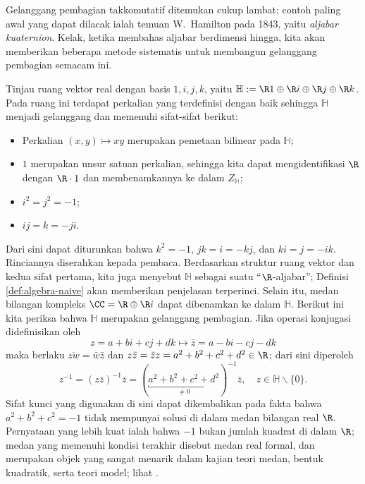 Gelanggang pembagian takkomutatif ditemukan cukup lambat; contoh paling awal yang dapat dilacak ialah temuan W.\ Hamilton pada 1843, yaitu \emph{aljabar kuaternion}. Kelak, ketika membahas aljabar berdimensi hingga, kita akan memberikan beberapa metode sistematis untuk membangun gelanggang pembagian semacam ini.
\begin{example}[Kuaternion]\label{eg:Hamilton-quaternion}
	Tinjau ruang vektor real dengan basis $1, i, j, k$, yaitu $\mathbb{H} := \R 1 \oplus \R i \oplus \R j \oplus \R k$. Pada ruang ini terdapat perkalian yang terdefinisi dengan baik sehingga $\mathbb{H}$ menjadi gelanggang dan memenuhi sifat-sifat berikut:
	\begin{itemize}
		\item Perkalian $(x,y) \mapsto xy$ merupakan pemetaan bilinear pada $\mathbb{H}$;
		\item $1$ merupakan unsur satuan perkalian, sehingga kita dapat mengidentifikasi $\R$ dengan $\R \cdot 1$ dan membenamkannya ke dalam $Z_{\mathbb{H}}$;
		\item $i^2 = j^2 = -1$;
		\item $ij=k=-ji$.
	\end{itemize}
	Dari sini dapat diturunkan bahwa $k^2 = -1$, $jk=i=-kj$, dan $ki=j=-ik$. Rinciannya diserahkan kepada pembaca. Berdasarkan struktur ruang vektor dan kedua sifat pertama, kita juga menyebut $\mathbb{H}$ sebagai suatu ``$\R$-aljabar''; Definisi \ref{def:algebra-naive} akan memberikan penjelasan terperinci. Selain itu, medan bilangan kompleks $\CC = \R \oplus \R i$ dapat dibenamkan ke dalam $\mathbb{H}$. Berikut ini kita periksa bahwa $\mathbb{H}$ merupakan gelanggang pembagian. Jika operasi konjugasi didefinisikan oleh
	\[ z = a + bi + cj + dk \longmapsto \bar{z} = a - bi -cj -dk \]
	maka berlaku $\overline{z w} = \bar{w}\bar{z}$ dan $z\bar{z} = \bar{z}z = a^2 + b^2 + c^2 + d^2 \in \R$; dari sini diperoleh
	\[ z^{-1} = (z\bar{z})^{-1} \bar{z} = (\underbracket{a^2 + b^2 + c^2 + d^2}_{\neq 0})^{-1} \bar{z}, \quad z \in \mathbb{H} \smallsetminus \{0\}. \]
	Sifat kunci yang digunakan di sini dapat dikembalikan pada fakta bahwa $a^2 + b^2 + c^2 = -1$ tidak mempunyai solusi di dalam medan bilangan real $\R$. Pernyataan yang lebih kuat ialah bahwa $-1$ bukan jumlah kuadrat di dalam $\R$; medan yang memenuhi kondisi terakhir disebut medan real formal, dan merupakan objek yang sangat menarik dalam kajian teori medan, bentuk kuadratik, serta teori model; lihat \cite[\S 9.1]{Feng17}. 
\end{example}
